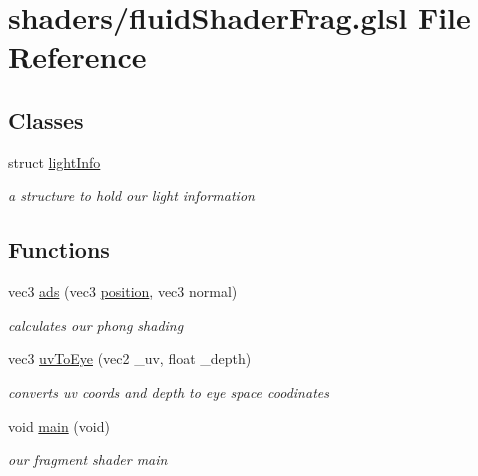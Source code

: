 \hypertarget{fluid_shader_frag_8glsl}{\section{shaders/fluid\-Shader\-Frag.glsl File Reference}
\label{fluid_shader_frag_8glsl}
}
\subsection*{Classes}
\begin{DoxyCompactItemize}
\item 
struct \hyperlink{structlight_info}{light\-Info}
\begin{DoxyCompactList}\small\item\em a structure to hold our light information \end{DoxyCompactList}\end{DoxyCompactItemize}
\subsection*{Functions}
\begin{DoxyCompactItemize}
\item 
vec3 \hyperlink{fluid_shader_frag_8glsl_aa92a70677efb9df36d42919ab01aaaf4}{ads} (vec3 \hyperlink{thickness_vert_8glsl_af78042b263da1185c97c3202ced45aab}{position}, vec3 normal)
\begin{DoxyCompactList}\small\item\em calculates our phong shading \end{DoxyCompactList}\item 
vec3 \hyperlink{fluid_shader_frag_8glsl_abd810f8b2d0a0892c1c9d96228c3017d}{uv\-To\-Eye} (vec2 \-\_\-uv, float \-\_\-depth)
\begin{DoxyCompactList}\small\item\em converts uv coords and depth to eye space coodinates \end{DoxyCompactList}\item 
\hypertarget{fluid_shader_frag_8glsl_a6288eba0f8e8ad3ab1544ad731eb7667}{void \hyperlink{fluid_shader_frag_8glsl_a6288eba0f8e8ad3ab1544ad731eb7667}{main} (void)}\label{fluid_shader_frag_8glsl_a6288eba0f8e8ad3ab1544ad731eb7667}

\begin{DoxyCompactList}\small\item\em our fragment shader main \end{DoxyCompactList}\end{DoxyCompactItemize}
